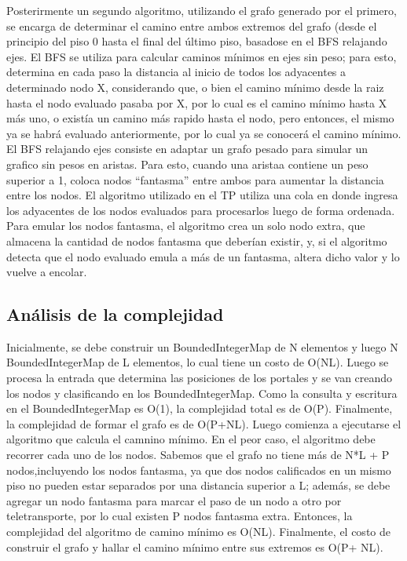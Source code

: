 Posterirmente un segundo algoritmo, utilizando el grafo generado por el primero, se encarga de determinar el camino entre ambos extremos del grafo (desde el principio del piso 0 hasta el final del último piso, basadose en el BFS relajando ejes. El BFS se utiliza para calcular caminos mínimos en ejes sin peso; para esto, determina en cada paso la distancia al inicio de todos los adyacentes a determinado nodo X, considerando que, o bien el camino mínimo desde la raiz hasta el nodo evaluado pasaba por X, por lo cual es el camino mínimo hasta X más uno, o existía un camino más rapido hasta el nodo, pero entonces, el mismo ya se habrá evaluado anteriormente, por lo cual ya se conocerá el camino mínimo. El BFS relajando ejes consiste en adaptar un grafo pesado para simular un grafico sin pesos en aristas. Para esto, cuando una aristaa contiene un peso superior a 1, coloca nodos ``fantasma'' entre ambos para aumentar la distancia entre los nodos.
El algoritmo utilizado en el TP utiliza una cola en donde ingresa los adyacentes de los nodos evaluados para procesarlos luego de forma ordenada. Para emular los nodos fantasma, el algoritmo crea un solo nodo extra, que almacena la cantidad de nodos fantasma que deberían existir, y, si el algoritmo detecta que el nodo evaluado emula a más de un fantasma, altera dicho valor y lo vuelve a encolar.

\subsection{Análisis de la complejidad}
Inicialmente, se debe construir un BoundedIntegerMap de N elementos y luego N BoundedIntegerMap de L elementos, lo cual tiene un costo de O(NL). Luego se procesa la entrada que determina las posiciones de los portales y se van creando los nodos y clasificando en los BoundedIntegerMap. Como la consulta y escritura en el BoundedIntegerMap es O(1), la complejidad total es de O(P). Finalmente, la complejidad de formar el grafo es de O(P+NL).
Luego comienza a ejecutarse el algoritmo que calcula el camnino mínimo. En el peor caso, el algoritmo debe recorrer cada uno de los nodos. Sabemos que el grafo no tiene más de N*L + P nodos,incluyendo los nodos fantasma, ya que dos nodos calificados en un mismo piso no pueden estar separados por una distancia superior a L; además, se debe agregar un nodo fantasma para marcar el paso de un nodo a otro por teletransporte, por lo cual existen P nodos fantasma extra. Entonces, la complejidad del algoritmo de camino mínimo es O(NL).
Finalmente, el costo de construir el grafo y hallar el camino mínimo entre sus extremos es O(P+ NL).

